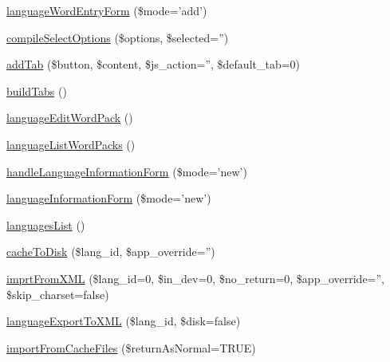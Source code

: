 \begin{DoxyCompactItemize}
\item 
\hyperlink{classadmin__core__languages__manage__languages_a152008aa97d030cb12a75a6a3e7f1666}{language\-Word\-Entry\-Form} (\$mode='add')
\item 
\hyperlink{classadmin__core__languages__manage__languages_a4e71e862b18eb34eed26cfbd52d8b390}{compile\-Select\-Options} (\$options, \$selected='')
\item 
\hyperlink{classadmin__core__languages__manage__languages_ad60f824e955c834bc199bb6ff7937753}{add\-Tab} (\$button, \$content, \$js\-\_\-action='', \$default\-\_\-tab=0)
\item 
\hyperlink{classadmin__core__languages__manage__languages_a3341fd0895c025511d60049eb6dd8784}{build\-Tabs} ()
\item 
\hyperlink{classadmin__core__languages__manage__languages_acddddeb70b42d9d3c3fcdb11556390aa}{language\-Edit\-Word\-Pack} ()
\item 
\hyperlink{classadmin__core__languages__manage__languages_a8fbf03cbf856f3a365c694409d11b7a9}{language\-List\-Word\-Packs} ()
\item 
\hyperlink{classadmin__core__languages__manage__languages_a56dba47349fd034324614b8a70062988}{handle\-Language\-Information\-Form} (\$mode='new')
\item 
\hyperlink{classadmin__core__languages__manage__languages_ace94d2dae4fd5ce166da27b2f84cfba0}{language\-Information\-Form} (\$mode='new')
\item 
\hyperlink{classadmin__core__languages__manage__languages_a6bde1e709405e107e86d1aa297078864}{languages\-List} ()
\item 
\hyperlink{classadmin__core__languages__manage__languages_afbd9879f1ad18820d741445de32fd1c4}{cache\-To\-Disk} (\$lang\-\_\-id, \$app\-\_\-override='')
\item 
\hyperlink{classadmin__core__languages__manage__languages_a22dea858653c6f3fa2f357525812c7ce}{imprt\-From\-X\-M\-L} (\$lang\-\_\-id=0, \$in\-\_\-dev=0, \$no\-\_\-return=0, \$app\-\_\-override='', \$skip\-\_\-charset=false)
\item 
\hyperlink{classadmin__core__languages__manage__languages_a0a486794578c853e56513727d71aa58d}{language\-Export\-To\-X\-M\-L} (\$lang\-\_\-id, \$disk=false)
\item 
\hyperlink{classadmin__core__languages__manage__languages_abcef3b02001b17c196a032a495a34a15}{import\-From\-Cache\-Files} (\$return\-As\-Normal=T\-R\-U\-E)
\end{DoxyCompactItemize}
